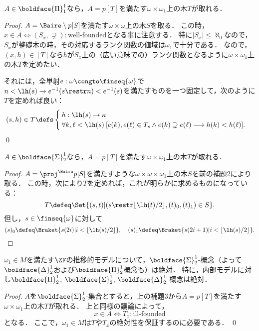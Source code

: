 \documentclass[xelatex,a4j,jadriver=standard]{bxjsarticle}
\begin{document}
\begin{lemma}
 $A \in \boldface{\Pi}^1_1$なら，$A = p[T]$を満たす$\omega \times \omega_1$上の木$T$が取れる．
\end{lemma}
\begin{proof}
 $A = \Baire \setminus p[S]$を満たす$\omega \times \omega$上の木$S$を取る．
 この時，$x \in A \iff (S_x, \supsetneq): \text{well-founded}$となる事に注意する．
 特に$|S_x| \leq \aleph_0$なので，$S_x$が整礎木の時，その対応するランク関数の値域は$\omega_1$で十分である．
 なので，$(x, h) \in [T]$なら$h$が$S_x$上の（広い意味での）ランク関数となるように$\omega \times \omega_1$上の木$T$を定めたい．

 それには，全単射$e: \omega \congto \finseq{\omega}$で$n < \lh(s) \rightarrow e^{-1}(s \restr n) < e^{-1}(s)$を満たすものを一つ固定して，次のように$T$を定めれば良い：
 \[
  (s, h) \in T \defs \begin{cases}
                     h: \lh(s) \to \kappa\\
                     \forall k, \ell < \lh(s)\:[e(k), e(\ell) \in T_s\wedge e(k) \supsetneq e(\ell) \longrightarrow h(k) < h(\ell)].
                    \end{cases}
 \]
 \qed
\end{proof}

\begin{lemma}
 $A \in \boldface{\Sigma}^1_2$なら，$A = p[T]$を満たす$\omega \times \omega_1$上の木$T$が取れる．
\end{lemma}
\begin{proof}
 $A = \proj^{\Baire} p[S]$を満たすような$\omega \times \omega \times \omega_1$上の木$S$を前の補題2により取る．
 この時，次により$T$を定めれば，これが明らかに求めるものになっている：
 \[
  T \defeq \Set{(s, t) | (s \restr \lfloor \lh(t)/2 \rfloor, (t)_0, (t)_1) \in S}.
 \]
 但し，$s \in \finseq{\omega}$に対して
 \[
  (s)_0 \defeq \Braket{s(2i)   | i < \lfloor \lh(s)/2 \rfloor},\quad 
  (s)_1 \defeq \Braket{s(2i+1) | i < \lfloor \lh(s)/2 \rfloor}.
 \]
\end{proof}

\begin{theorem}
 $\omega_1 \in M$を満たす$\ZF$の推移的モデルについて，$\boldface{\Sigma}^1_2$-概念（よって$\boldface{\Delta}^1_2$および$\boldface{\Pi}^1_2$概念も）は絶対．
 特に，内部モデルに対し$\boldface{\Pi}^1_2$, $\boldface{\Sigma}^1_2$, $\boldface{\Delta}^1_2$-概念は絶対．
\end{theorem}
\begin{proof}
 $A$を$\boldface{\Sigma}^1_2$-集合とすると，上の補題3から$A = p[T]$を満たす$\omega \times \omega_1$上の木$T$が取れる．
 上と同様の議論によって，
 \[
  x \in A \iff T_x: \text{ill-founded}
 \]
 となる．
 ここで，$\omega_1 \in M$は$T$や$T_x$の絶対性を保証するのに必要である．
 \qed
\end{proof}


\nocite{Kunen:2011,Jech:2002,Arai:2011,Kunen:2009}
\printbibliography[title=参考文献]
\end{document}
